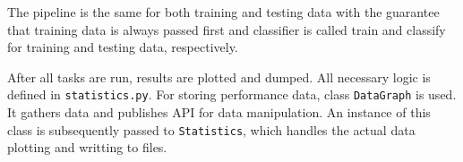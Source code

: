 The pipeline is the same for both training and testing data with the guarantee that
training data is always passed first and classifier is called train and classify for
training and testing data, respectively.

After all tasks are run, results are plotted and dumped.
All necessary logic is defined in \texttt{statistics.py}.
For storing performance data, class \texttt{DataGraph} is used.
It gathers data and publishes API for data manipulation.
An instance of this class is subsequently passed to \texttt{Statistics},
which handles the actual data plotting and writting to files.



